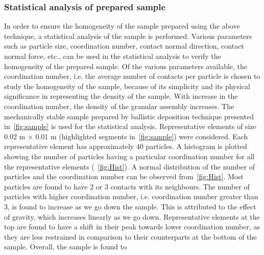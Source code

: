 
\subsubsection{Statistical analysis of prepared sample}
In order to ensure the homogeneity of the sample prepared using the above 
technique, a statistical 
analysis of the sample is performed. Various parameters such as particle size, 
coordination 
number, 
contact normal direction, contact normal force, etc., can be used in the 
statistical analysis to 
verify the homogeneity of the prepared sample. Of the various parameters 
available, the 
coordination number, i.e. the average number of contacts per particle is chosen 
to study the 
homogeneity of the sample, because of its simplicity and its physical 
significance in representing 
the density of the sample. With increase in the coordination number, the 
density of the granular 
assembly increases. The mechanically stable sample prepared by ballistic 
deposition technique 
presented in~\cref{fig:sample} is used for the statistical analysis. 
Representative elements 
of size 0.02 m $\times$ 0.01 m (highlighted segments in~\cref{fig:sample}) were 
considered. 
Each representative element has approximately 40 particles. A histogram is 
plotted showing the 
number of particles having a particular coordination number for all the 
representative elements 
(~\cref{fig:Hist}). A normal distribution of the number of particles and the 
coordination 
number can be observed from~\cref{fig:Hist}. Most particles are found to have 2 
or 3 contacts 
with its neighbours. The number of particles with higher coordination number, 
i.e. coordination 
number greater than 3, is found to increase as we go down the sample. This is 
attributed to the 
effect of gravity, which increases linearly as we go down. Representative 
elements at the top are 
found to have a shift in their peak towards lower coordination number, as they 
are less restrained 
in comparison to their counterparts at the bottom of the sample. Overall, the 
sample is found to 
